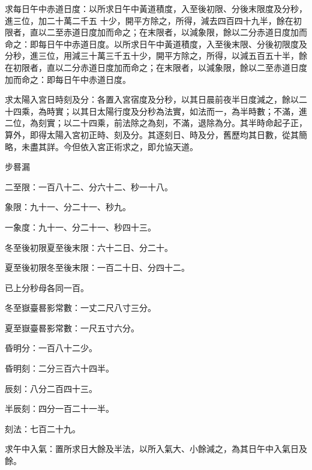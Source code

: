\begin{pinyinscope}
 求每日午中赤道日度：以所求日午中黃道積度，入至後初限、分後末限度及分秒，進三位，加二十萬二千五
 十少，開平方除之，所得，減去四百四十九半，餘在初限者，直以二至赤道日度加而命之；在末限者，以減象限，餘以二分赤道日度加而命之：即每日午中赤道日度。以所求日午中黃道積度，入至後末限、分後初限度及分秒，進三位，用減三十萬三千五十少，開平方除之，所得，以減五百五十半，餘在初限者，直以二分赤道日度加而命之；在末限者，以減象限，餘以二至赤道日度加而命之：即每日午中赤道日度。



 求太陽入宮日時刻及分：各置入宮宿度及分秒，以其日晨前夜半日度減之，餘以二十四乘，為時實；以其日太陽行度及分秒為法實，如法而一，為半時數；不滿，進二位，為刻實；以二十四乘，前法除之為刻，不滿，退除為分。其半時命起子正，算外，即得太陽入宮初正時、刻及分。其逐刻日、時及分，舊歷均其日數，從其簡略，未盡其詳。今但依入宮正術求之，即允協天道。



 步晷漏



 二至限：一百八十二、分六十二、秒一十八。



 象限：九十一、分二十一、秒九。



 一象度：九十一、分二十一、秒四十三。



 冬至後初限夏至後末限：六十二日、分二十。



 夏至後初限冬至後末限：一百二十日、分四十二。



 已上分秒母各同一百。



 冬至嶽臺晷影常數：一丈二尺八寸三分。



 夏至嶽臺晷影常數：一尺五寸六分。



 昏明分：一百八十二少。



 昏明刻：二分三百六十四半。



 辰刻：八分二百四十三。



 半辰刻：四分一百二十一半。



 刻法：七百二十九。



 求午中入氣：置所求日大餘及半法，以所入氣大、小餘減之，為其日午中入氣日及餘。




\end{pinyinscope}
